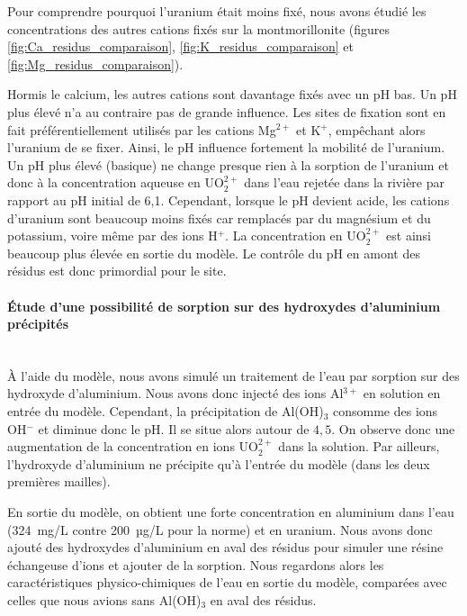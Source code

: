 \documentclass{article}
\begin{document}
Pour comprendre pourquoi l’uranium était moins fixé, nous avons étudié les concentrations des autres cations fixés sur la montmorillonite (figures \ref{fig:Ca_residus_comparaison}, \ref{fig:K_residus_comparaison} et \ref{fig:Mg_residus_comparaison}).

Hormis le calcium, les autres cations sont davantage fixés avec un pH bas. Un pH plus élevé n'a au contraire pas de grande influence. Les sites de fixation sont en fait préférentiellement utilisés par les cations Mg$^{2+}$ et K$^{+}$, empêchant alors l’uranium de se fixer.
Ainsi, le pH influence fortement la mobilité de l’uranium. Un pH plus élevé (basique) ne change presque rien à la sorption de l’uranium et donc à la concentration aqueuse en UO$_2^{2+}$ dans l’eau rejetée dans la rivière par rapport au pH initial de 6,1. Cependant, lorsque le pH devient acide, les cations d’uranium sont beaucoup moins fixés car remplacés par du magnésium et du potassium, voire même par des ions H$^{+}$. La concentration en UO$_2^{2+}$ est ainsi beaucoup plus élevée en sortie du modèle. Le contrôle du pH en amont des résidus est donc primordial pour le site.

\paragraph{Étude d'une possibilité de sorption sur des hydroxydes d'aluminium précipités \\ \\}
À l'aide du modèle, nous avons simulé un traitement de l’eau par sorption sur des hydroxyde d’aluminium. Nous avons donc injecté des ions Al$^{3+}$ en solution en entrée du modèle. Cependant, la précipitation de Al(OH)$_3$ consomme des ions OH$^{-}$ et diminue donc le pH. Il se situe alors autour de $4,5$. On observe donc une augmentation de la concentration en ions UO$_2^{2+}$ dans la solution. Par ailleurs, l’hydroxyde d’aluminium ne précipite qu'à l’entrée du modèle (dans les deux premières mailles).

En sortie du modèle, on obtient une forte concentration en aluminium dans l’eau (324~mg/L contre 200~µg/L pour la norme) et en uranium. Nous avons donc ajouté des hydroxydes d’aluminium en aval des résidus pour simuler une résine échangeuse d’ions et ajouter de la sorption.
Nous regardons alors les caractéristiques physico-chimiques de l’eau en sortie du modèle, comparées avec celles que nous avions sans Al(OH)$_3$ en aval des résidus.
\end{document}
